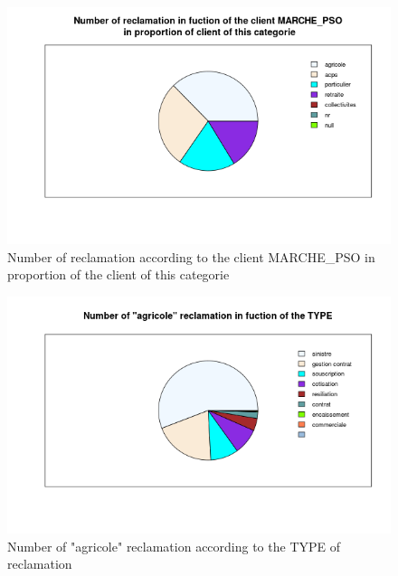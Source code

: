 \documentclass[a4paper, 11pt]{article}
\begin{document}
        \begin{figure}[!ht]
        	\centering
                \includegraphics[height = 10 cm]{Valentin/Number_of_reclamation_in_fuction_of_the_client_MARCHE_PSO_proportion.png}
                \caption{Number of reclamation according to the client MARCHE\_PSO in proportion of the client of this categorie}
                \label{fig:reclamtion_pso3}
        \end{figure}
        
        \begin{figure}[!ht]
        	\centering
                \includegraphics[height = 10 cm]{Valentin/Number_of_agricole_reclamation_in_fuction_of_the_TYPE.png}
                \caption{Number of "agricole" reclamation according to the TYPE of reclamation}
                \label{fig:reclamtion_agri}
        \end{figure}
        
\end{document}
